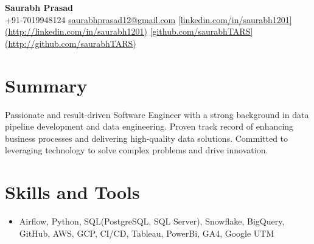 \documentclass[letterpaper,10pt]{article}
\newcommand{\resumeItem}[1]{\item\small{#1}}
\newcommand{\resumeSubHeadingList}{\begin{itemize}[leftmargin=0.10in, label={}]}
\newcommand{\resumeSubHeadingListEnd}{\end{itemize}}
\newcommand{\customHeading}[1]{%
\fontfamily{phv}\selectfont\Huge #1
}
\begin{document}
\begin{center}
\textbf{\customHeading{Saurabh Prasad}} \\
\small \faPhone \hspace{0.5em} +91-7019948124 \hspace{1em}
\faEnvelope \hspace{0.5em} \href{[mailto:saurabhprasad12@email.com](mailto:saurabhprasad12@email.com)}{saurabhprasad12@gmail.com} \hspace{1em}
\faLinkedin \hspace{0.5em} \href{https://linkedin.com/in/saurabh1201}{[linkedin.com/in/saurabh1201](http://linkedin.com/in/saurabh1201)} \hspace{1em}
\faGithub \hspace{0.5em} \href{https://github.com/saurabhTARS}{[github.com/saurabhTARS](http://github.com/saurabhTARS)}
\end{center}

\section*{Summary}
Passionate and result-driven Software Engineer with a strong background in data pipeline development and data engineering. Proven track record of enhancing business processes and delivering high-quality data solutions. Committed to leveraging technology to solve complex problems and drive innovation.

\section{Skills and Tools}
\resumeSubHeadingList
\resumeItem{Airflow, Python, SQL(PostgreSQL, SQL Server), Snowflake, BigQuery, GitHub, AWS, GCP, CI/CD, Tableau, PowerBi, GA4, Google UTM}
\resumeSubHeadingListEnd
\end{document}

